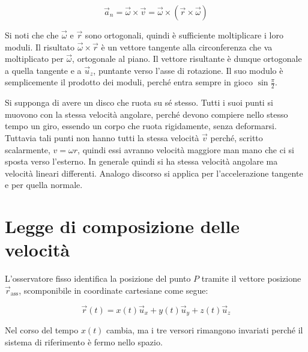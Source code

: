 \[
	\vec{a}_n=\vec{\omega} \times \vec{v}=\vec{\omega} \times ( \vec{r} \times \vec{\omega})
\]

Si noti che che $\vec{\omega}$ e $\vec{r}$ sono ortogonali, quindi è sufficiente moltiplicare i loro moduli. Il risultato $\vec{\omega} \times \vec{r}$ è un vettore tangente alla circonferenza che va moltiplicato per $\vec{\omega}$, ortogonale al piano. Il vettore risultante è dunque ortogonale a quella tangente e a $\vec{u}_z$, puntante verso l'asse di rotazione. Il suo modulo è semplicemente il prodotto dei moduli, perché entra sempre in gioco $\sin\frac{\pi}{2}$.

Si supponga di avere un disco che ruota su sé stesso. Tutti i suoi punti si muovono con la stessa velocità angolare, perché devono compiere nello stesso tempo un giro, essendo un corpo che ruota rigidamente, senza deformarsi. Tuttavia tali punti non hanno tutti la stessa velocità $\vec{v}$ perché, scritto scalarmente, $v=\omega r$, quindi essi avranno velocità maggiore man mano che ci si sposta verso l'esterno. In generale quindi si ha stessa velocità angolare ma velocità lineari differenti. Analogo discorso si applica per l'accelerazione tangente e per quella normale.

\section{Legge di composizione delle velocità}

L'osservatore fisso identifica la posizione del punto $P$ tramite il vettore posizione $\vec{r}_{\text{ass}}$, scomponibile in coordinate cartesiane come segue:

\[
	\vec{r}(t)=x(t) \vec{u}_x+y(t)\vec{u}_y+z(t)\vec{u}_z
\]

Nel corso del tempo $x(t)$ cambia, ma i tre versori rimangono invariati perché il sistema di riferimento è fermo nello spazio.

